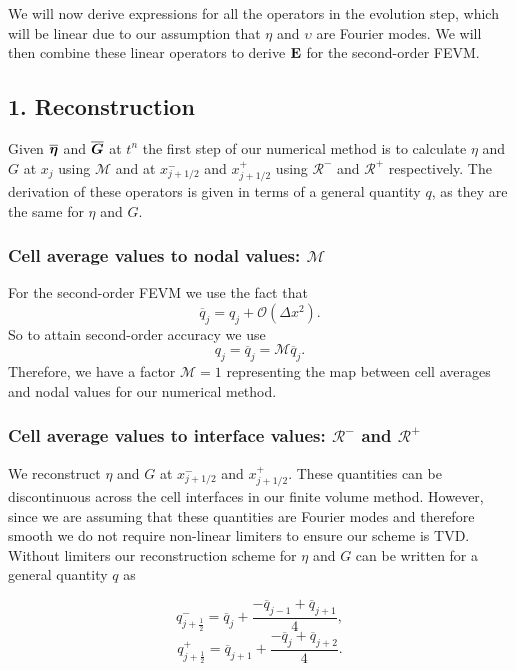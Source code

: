 We will now derive expressions for all the operators in the evolution step, which will be linear due to our assumption that $\eta$ and $\upsilon$ are Fourier modes. We will then combine these linear operators to derive $\mathbf{E}$ for the second-order FEVM.

\subsection{1. Reconstruction}
Given $\overline{\boldsymbol{\eta}}$ and $\overline{\boldsymbol{G}}$ at $t^n$ the first step of our numerical method is to calculate $\eta$ and $G$ at $x_j$ using $\mathcal{M}$ and at $x^-_{j+1/2}$ and $x^+_{j+1/2}$ using $\mathcal{R}^-$ and $\mathcal{R}^+$ respectively. The derivation of these operators is given in terms of a general quantity $q$, as they are the same for $\eta$ and $G$.
\subsubsection{Cell average values to nodal values: $\mathcal{M}$}
For the second-order FEVM we use the fact that
\begin{equation*}
\overline{q}_j =q_j  + \mathcal{O}\left(\Delta x^2\right).
\end{equation*}
%
So to attain second-order accuracy we use
%
\begin{equation}
\label{eqn:Mfactorfourier}
q_j = \overline{q}_j  = \mathcal{M} \overline{q}_j.
\end{equation}
Therefore, we have a factor $\mathcal{M}=1$ representing the map between cell averages and nodal values for our numerical method.

\subsubsection{Cell average values to interface values: $\mathcal{R}^-$ and $\mathcal{R}^+$}

We reconstruct $\eta$ and $G$ at $x^-_{j+1/2}$ and $x^+_{j+1/2}$. These quantities can be discontinuous across the cell interfaces in our finite volume method. However, since we are assuming that these quantities are Fourier modes and therefore smooth we do not require non-linear limiters to ensure our scheme is TVD. Without limiters our reconstruction scheme for $\eta$ and $G$ can be written for a general quantity $q$ as

\begin{equation*}
q^-_{j+\frac{1}{2}} = \overline{q}_j + \frac{- \overline{q}_{j - 1} + \overline{q}_{j+ 1} }{4},
\end{equation*}
\begin{equation*}
q^+_{j+\frac{1}{2}} = \overline{q}_{j+1} + \frac{- \overline{q}_{j} + \overline{q}_{j+ 2}}{4}.
\end{equation*}

